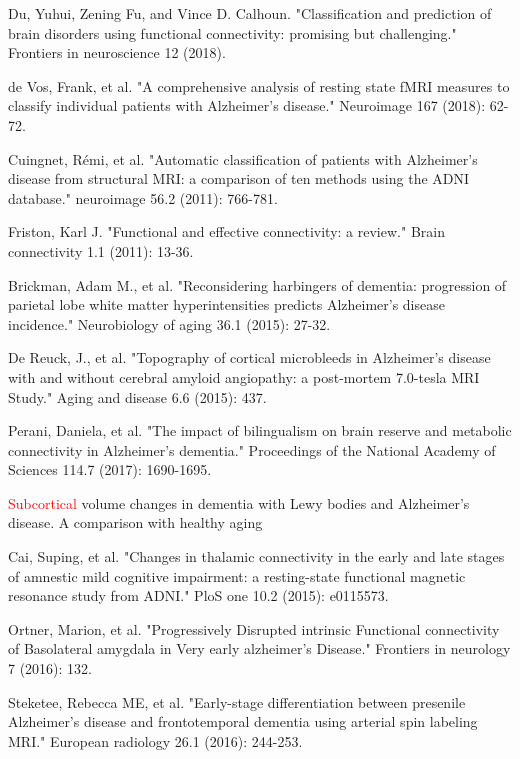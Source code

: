 \documentclass[preprint,12pt]{elsarticle}
\begin{document}
\begin{thebibliography}{1}
		
		
		Du, Yuhui, Zening Fu, and Vince D. Calhoun. "Classification and prediction of brain disorders using functional connectivity: promising but challenging." Frontiers in neuroscience 12 (2018).
		
		de Vos, Frank, et al. "A comprehensive analysis of resting state fMRI measures to classify individual patients with Alzheimer's disease." Neuroimage 167 (2018): 62-72.
		
		Cuingnet, Rémi, et al. "Automatic classification of patients with Alzheimer's disease from structural MRI: a comparison of ten methods using the ADNI database." neuroimage 56.2 (2011): 766-781.
		
		Friston, Karl J. "Functional and effective connectivity: a review." Brain connectivity 1.1 (2011): 13-36.
		
		
		Brickman, Adam M., et al. "Reconsidering harbingers of dementia: progression of parietal lobe white matter hyperintensities predicts Alzheimer's disease incidence." Neurobiology of aging 36.1 (2015): 27-32.
		
		De Reuck, J., et al. "Topography of cortical microbleeds in Alzheimer’s disease with and without cerebral amyloid angiopathy: a post-mortem 7.0-tesla MRI Study." Aging and disease 6.6 (2015): 437.
		
		Perani, Daniela, et al. "The impact of bilingualism on brain reserve and metabolic connectivity in Alzheimer's dementia." Proceedings of the National Academy of Sciences 114.7 (2017): 1690-1695.
		
		\textcolor{red}{Subcortical} volume changes in dementia with Lewy bodies and Alzheimer's disease. A comparison with healthy aging
		
		Cai, Suping, et al. "Changes in thalamic connectivity in the early and late stages of amnestic mild cognitive impairment: a resting-state functional magnetic resonance study from ADNI." PloS one 10.2 (2015): e0115573.
		
		Ortner, Marion, et al. "Progressively Disrupted intrinsic Functional connectivity of Basolateral amygdala in Very early alzheimer’s Disease." Frontiers in neurology 7 (2016): 132.
		
		Steketee, Rebecca ME, et al. "Early-stage differentiation between presenile Alzheimer’s disease and frontotemporal dementia using arterial spin labeling MRI." European radiology 26.1 (2016): 244-253.
		

\end{thebibliography}
\end{document}
